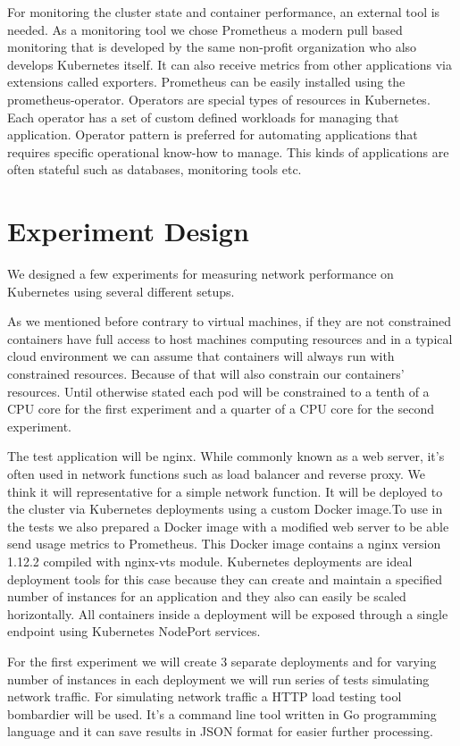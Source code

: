 \documentclass[12pt,oneandhalf,chaparabic,ceng,ms,eng,oneside,pntc]{gsufbe}
\begin{document}
For monitoring the cluster state and container performance, an external tool is needed.  As a monitoring
tool we chose Prometheus a modern pull based monitoring that is developed by the same non-profit 
organization who also develops Kubernetes itself. It can also receive metrics from other applications
via extensions called exporters. Prometheus can be easily installed using the prometheus-operator.
Operators are special types of resources in Kubernetes.  Each operator has a set of custom defined
workloads for managing that application. Operator pattern is preferred for automating applications that
requires specific operational know-how to manage.  This kinds of applications are often stateful such as
databases, monitoring tools etc.

\section{Experiment Design}
We designed a few experiments for measuring network performance on Kubernetes using several different
setups.

As we mentioned before contrary to virtual machines, if they are not constrained containers have full
access to host machines computing resources and in a typical cloud environment we can assume that
containers will always run with constrained resources.  Because of that will also constrain our
containers' resources.  Until otherwise stated each pod will be constrained to a tenth of a CPU core
for the first experiment and a quarter of a CPU core for the second experiment.

The test application will be nginx. While commonly known as a web server, it's often used in network
functions such as load balancer and reverse proxy. We think it will representative for a simple network
function.  It will be deployed to the cluster via Kubernetes
deployments using a custom Docker image.To use in the tests we also  prepared a Docker image with a
modified web server to be able send usage metrics to Prometheus.  This Docker image contains a nginx
version 1.12.2 compiled with nginx-vts module. Kubernetes deployments are ideal deployment tools for
this case  because they can create and maintain a specified number of instances for an application and
they also can easily be scaled horizontally.  All containers inside a deployment will be exposed 
through a single endpoint using Kubernetes NodePort services.

For the first experiment we will create 3 separate deployments and for varying number of
instances in each deployment we will run series of tests simulating network traffic.  For simulating
network traffic a HTTP load testing tool bombardier will be used.  It's a command line tool written in
Go programming language and it can save results in JSON format for easier further processing. 
\end{document}
